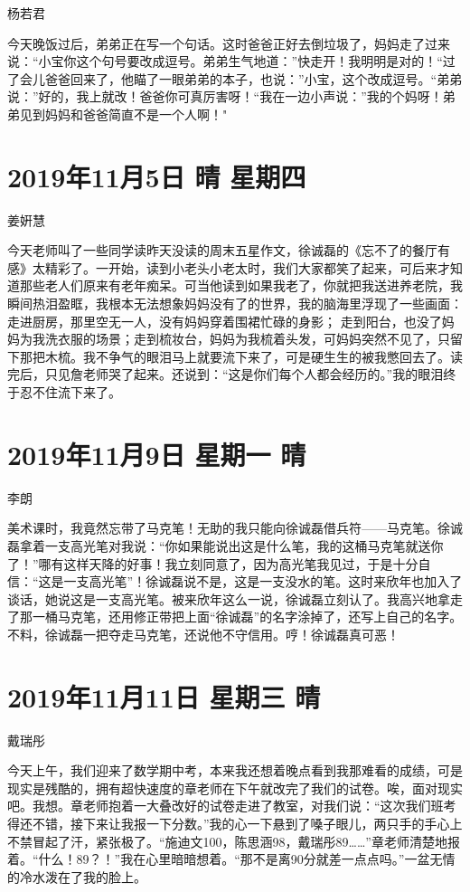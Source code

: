 杨若君

今天晚饭过后，弟弟正在写一个句话。这时爸爸正好去倒垃圾了，妈妈走了过来说：``小宝你这个句号要改成逗号。弟弟生气地道：''快走开！我明明是对的！``过了会儿爸爸回来了，他瞄了一眼弟弟的本子，也说：''小宝，这个改成逗号。``弟弟说：''好的，我上就改！爸爸你可真厉害呀！``我在一边小声说：''我的个妈呀！弟弟见到妈妈和爸爸简直不是一个人啊！"

\section{2019年11月5日 晴 星期四}

姜姸慧

今天老师叫了一些同学读昨天没读的周末五星作文，徐诚磊的《忘不了的餐厅有感》太精彩了。一开始，读到小老头小老太时，我们大家都笑了起来，可后来才知道那些老人们原来有老年痴呆。可当他读到如果我老了，你就把我送进养老院，我瞬间热泪盈眶，我根本无法想象妈妈没有了的世界，我的脑海里浮现了一些画面：走进厨房，那里空无一人，没有妈妈穿着围裙忙碌的身影；
走到阳台，也没了妈妈为我洗衣服的场景；走到梳妆台，妈妈为我梳着头发，可妈妈突然不见了，只留下那把木梳。我不争气的眼泪马上就要流下来了，可是硬生生的被我憋回去了。读完后，只见詹老师哭了起来。还说到：``这是你们每个人都会经历的。''我的眼泪终于忍不住流下来了。

\section{2019年11月9日 星期一 晴}

李朗

美术课时，我竟然忘带了马克笔！无助的我只能向徐诚磊借兵符------马克笔。徐诚磊拿着一支高光笔对我说：``你如果能说出这是什么笔，我的这桶马克笔就送你了！''哪有这样天降的好事！我立刻同意了，因为高光笔我见过，于是十分自信：``这是一支高光笔''！徐诚磊说不是，这是一支没水的笔。这时来欣年也加入了谈话，她说这是一支高光笔。被来欣年这么一说，徐诚磊立刻认了。我高兴地拿走了那一桶马克笔，还用修正带把上面``徐诚磊''的名字涂掉了，还写上自己的名字。不料，徐诚磊一把夺走马克笔，还说他不守信用。哼！徐诚磊真可恶！

\section{2019年11月11日 星期三 晴}

戴瑞彤

今天上午，我们迎来了数学期中考，本来我还想着晚点看到我那难看的成绩，可是现实是残酷的，拥有超快速度的章老师在下午就改完了我们的试卷。唉，面对现实吧。我想。章老师抱着一大叠改好的试卷走进了教室，对我们说：``这次我们班考得还不错，接下来让我报一下分数。''我的心一下悬到了嗓子眼儿，两只手的手心上不禁冒起了汗，紧张极了。``施迪文100，陈思涵98，戴瑞彤89\ldots\ldots{}''章老师清楚地报着。``什么！89？！''我在心里暗暗想着。``那不是离90分就差一点点吗。''一盆无情的冷水泼在了我的脸上。

